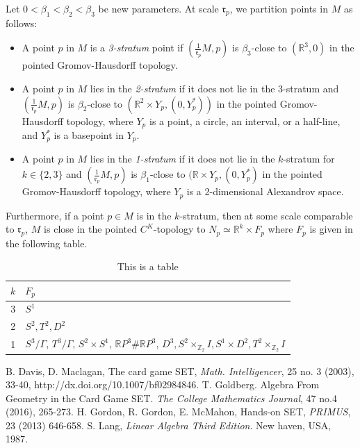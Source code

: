 \documentclass[ma493]{swumath}
\begin{document}
Let $0 < \beta_1 < \beta_2 < \beta_3$ be new parameters. 
At scale $\mathfrak{r}_p$, we partition points in $M$ as follows:
\begin{itemize}
\item A point $p$ in $M$ is a \emph{3-stratum} point if $(\frac{1}{\mathfrak{r}_p} M, p)$ is $\beta_3$-close to $(\mathbb{R}^3, 0)$ in the pointed Gromov-Hausdorff topology.
\item A point $p$ in $M$ lies in the \emph{2-stratum} if it does not lie in the 3-stratum and $(\frac{1}{\mathfrak{r}_p} M, p)$ is $\beta_2$-close to $(\mathbb{R}^2 \times Y_p, (0, Y^*_p))$ in the pointed Gromov-Hausdorff topology, where
$Y_p$ is a point, a circle, an interval, or a half-line, and $Y^*_p$ is a basepoint in $Y_p$.
\item A point $p$ in $M$ lies in the \emph{1-stratum} if it does not lie in the $k$-stratum for $k \in \{2,3\}$ and 
$(\frac{1}{\mathfrak{r}_p} M, p)$ is $\beta_1$-close to $(\mathbb{R} \times Y_p, (0, Y^*_p)$ in the pointed Gromov-Hausdorff topology, where
$Y_p$ is a 2-dimensional Alexandrov space.
\end{itemize}

Furthermore, if a point $p \in M$ is in the $k$-stratum, then 
at some scale comparable to $\mathfrak{r}_p$, $M$ is 
close in the pointed $C^K$-topology to $N_p \simeq \mathbb{R}^k \times F_p$ where $F_p$ is given in the following table.

\begin{table}[h]
\centering
\begin{tabular}{|c|l|} 
\hline
$k$ & $F_p$ \\ \hline
3 & $S^1$ \\ \hline
2 & $S^2, T^2, D^2$ \\ \hline
1 & $S^3/\Gamma$, $T^3/\Gamma$, $S^2 \times S^1$, $\mathbb{R}P^3 \# \mathbb{R}P^3$,
$D^3, S^2 \times_{\mathbb{Z}_2} I, S^1 \times D^2, T^2 \times_{\mathbb{Z}_2} I$ \\ \hline
\end{tabular}
\caption{This is a table}
\end{table}

\begin{thebibliography}{20}
 B. Davis, D. Maclagan, The card game SET, \emph{Math. Intelligencer}, 25 no. 3 (2003), 33-40, http://dx.doi.org/10.1007/bf02984846.
 T. Goldberg. Algebra From Geometry in the Card Game SET. \emph{The College Mathematics Journal}, 47 no.4 (2016), 265-273.
 H. Gordon, R. Gordon, E. McMahon, Hands-on SET, \emph{PRIMUS}, 23 (2013) 646-658.  
 S. Lang, \emph{Linear Algebra Third Edition}. New haven, USA, 1987.
\end{thebibliography}
\end{document}

